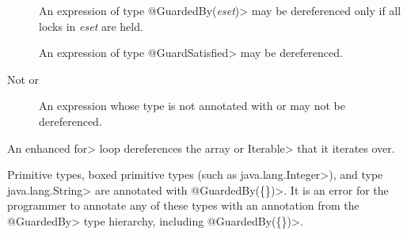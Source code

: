 
\begin{description}

\item[]
  An expression of type \<@GuardedBy(\emph{eset})> may be dereferenced only
  if all locks in \emph{eset} are held.

\item[]
  An expression of type \<@GuardSatisfied> may be dereferenced.

\item[Not  or ]
  An expression whose type is not annotated with  or
   may not be dereferenced.

\end{description}

An enhanced \<for> loop dereferences the array or \<Iterable> that it
iterates over.


Primitive types, boxed primitive types (such as \<java.lang.Integer>), and type \<java.lang.String>
are annotated with \<@GuardedBy(\{\})>.
It is an error for the programmer to annotate any of these types with an annotation from
the \<@GuardedBy> type hierarchy, including \<@GuardedBy(\{\})>.


